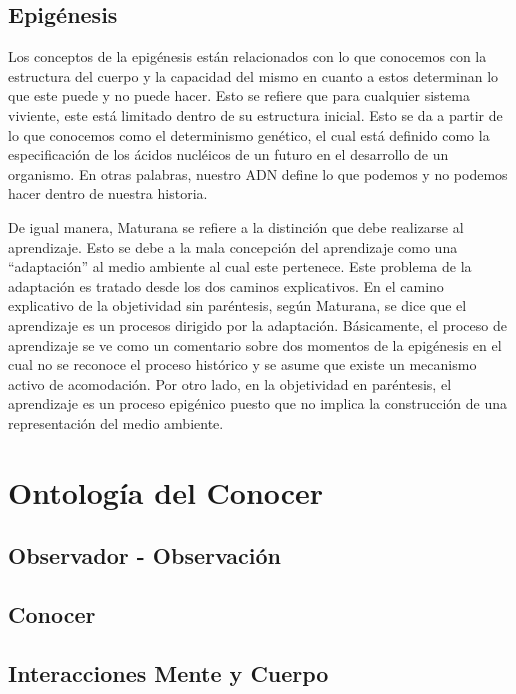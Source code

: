 \documentclass[10pt]{article}
\begin{document}
        \subsection{Epigénesis}

        Los conceptos de la epigénesis están relacionados con lo que conocemos con la estructura del cuerpo y la capacidad del mismo en cuanto a estos determinan lo que este puede y no puede hacer.  Esto se refiere que para cualquier sistema viviente, este está limitado dentro de su estructura inicial. Esto se da a partir de lo que conocemos como el determinismo genético, el cual está definido como la especificación de los ácidos nucléicos de un futuro en el desarrollo de un organismo. En otras palabras, nuestro ADN define lo que podemos y no podemos hacer dentro de nuestra historia.

        De igual manera, Maturana se refiere a la distinción que debe realizarse al aprendizaje. Esto se debe a la mala concepción del aprendizaje como una ``adaptación'' al medio ambiente al cual este pertenece. Este problema de la adaptación es tratado desde los dos caminos explicativos. En el camino explicativo de la objetividad sin paréntesis, según Maturana, se dice que el aprendizaje es un procesos dirigido por la adaptación. Básicamente, el proceso de aprendizaje se ve como un comentario sobre dos momentos de la epigénesis en el cual no se reconoce el proceso histórico y se asume que existe un mecanismo activo de acomodación. Por otro lado, en la objetividad en paréntesis, el aprendizaje es un proceso epigénico puesto que no implica la construcción de una representación del medio ambiente.

    \section{Ontología del Conocer}

        \subsection{Observador - Observación}

        \subsection{Conocer}

        \subsection{Interacciones Mente y Cuerpo}
\end{document}
